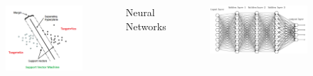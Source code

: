 \documentclass[mathserif]{beamer}
\begin{document}
\begin{frame}
\begin{columns}[t]
\begin{figure}
\includegraphics[width=\textwidth]{../figures/SVM-Planes.png}
\end{figure}

\pause


\begin{center}Neural Networks\end{center}

\begin{figure}
\includegraphics[width=\textwidth]{../figures/deep.png}
\end{figure}

\end{columns}

\end{frame}

\end{document}
